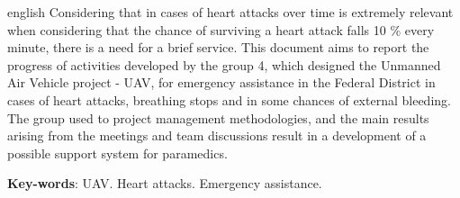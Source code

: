 \begin{resumo}[Abstract]
 \begin{otherlanguage*}{english}
  Considering that in cases of heart attacks over time is extremely relevant when considering that the chance of surviving a heart attack falls 10 \% \cite{SBC} every minute, there is a need for a brief service.
This document aims to report the progress of activities developed by the group 4, which designed the Unmanned Air Vehicle project - UAV, for emergency assistance in the Federal District in cases of heart attacks, breathing stops and in some chances of external bleeding.
The group used to project management methodologies, and the main results arising from the meetings and team discussions result in a development of a possible support system for paramedics.

   \vspace{\onelineskip}
 
   \noindent 
   \textbf{Key-words}: UAV. Heart attacks. Emergency assistance.
 \end{otherlanguage*}
\end{resumo}
